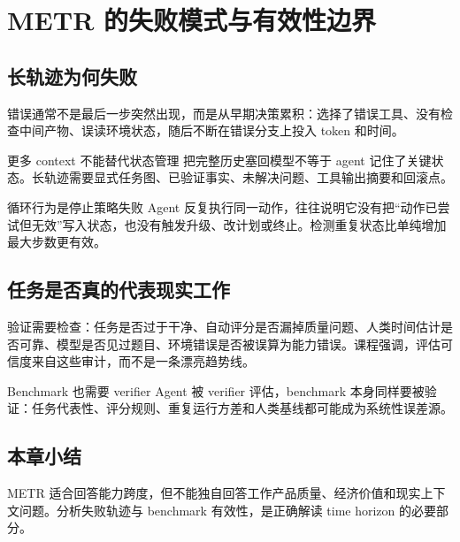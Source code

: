 \section{METR 的失败模式与有效性边界}

\subsection{长轨迹为何失败}


错误通常不是最后一步突然出现，而是从早期决策累积：选择了错误工具、没有检查中间产物、误读环境状态，随后不断在错误分支上投入 token 和时间。

\begin{warningbox}{更多 context 不能替代状态管理}
把完整历史塞回模型不等于 agent 记住了关键状态。长轨迹需要显式任务图、已验证事实、未解决问题、工具输出摘要和回滚点。
\end{warningbox}

\begin{knowledgebox}{循环行为是停止策略失败}
Agent 反复执行同一动作，往往说明它没有把“动作已尝试但无效”写入状态，也没有触发升级、改计划或终止。检测重复状态比单纯增加最大步数更有效。
\end{knowledgebox}

\subsection{任务是否真的代表现实工作}


验证需要检查：任务是否过于干净、自动评分是否漏掉质量问题、人类时间估计是否可靠、模型是否见过题目、环境错误是否被误算为能力错误。课程强调，评估可信度来自这些审计，而不是一条漂亮趋势线。

\begin{importantbox}{Benchmark 也需要 verifier}
Agent 被 verifier 评估，benchmark 本身同样要被验证：任务代表性、评分规则、重复运行方差和人类基线都可能成为系统性误差源。
\end{importantbox}

\subsection{本章小结}

METR 适合回答能力跨度，但不能独自回答工作产品质量、经济价值和现实上下文问题。分析失败轨迹与 benchmark 有效性，是正确解读 time horizon 的必要部分。

